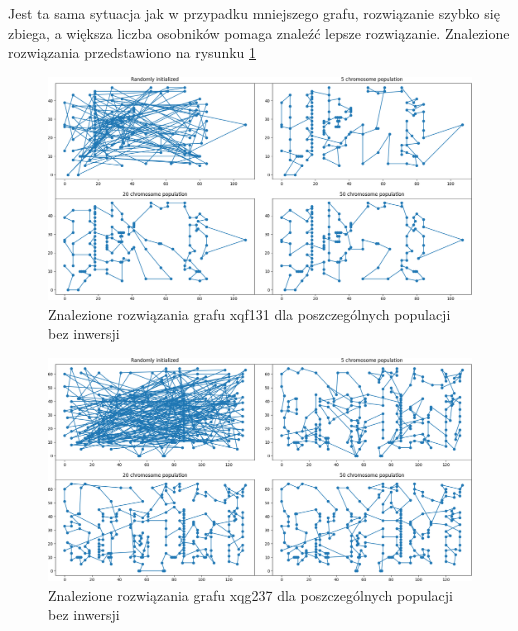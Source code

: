 \documentclass[11pt]{article}
\begin{document}
Jest ta sama sytuacja jak w przypadku mniejszego grafu, rozwiązanie szybko się
zbiega, a większa liczba osobników pomaga znaleźć lepsze rozwiązanie.
Znalezione rozwiązania przedstawiono na rysunku \cref{fig:v1_solutions}
\begin{figure}
    \centerline{\includegraphics[scale=0.5]{../131_obrazy.png}}
    \caption{Znalezione rozwiązania grafu xqf131 dla poszczególnych populacji
    bez inwersji}
    \label{fig:v1_solutions}
\end{figure}
\begin{figure}
    \centerline{\includegraphics[scale=0.5]{../237_obrazy.png}}
    \caption{Znalezione rozwiązania grafu xqg237 dla poszczególnych populacji
    bez inwersji}
    \label{fig:v1_solutions_237}
\end{figure}
\end{document}
